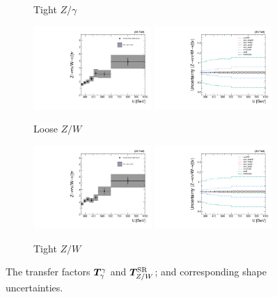 \begin{figure}[]
\begin{center}
\begin{subfigure}[t]{0.49\textwidth}
            \caption{Tight $Z/\gamma$}
        \end{subfigure}
        \begin{subfigure}[t]{0.49\textwidth}
            \includegraphics[width=0.49\textwidth]{figures/monotop/xfer/rfactor_wz_loose.pdf}
            \includegraphics[width=0.49\textwidth]{figures/monotop/uncertainties/variations_wz_loose.pdf}
            \caption{Loose $Z/W$}
        \end{subfigure}
        \begin{subfigure}[t]{0.49\textwidth}
            \includegraphics[width=0.49\textwidth]{figures/monotop/xfer/rfactor_wz.pdf}
            \includegraphics[width=0.49\textwidth]{figures/monotop/uncertainties/variations_wz.pdf}
            \caption{Tight $Z/W$}
        \end{subfigure}
        \caption{The transfer factors $\bm{T}^{\gamma}_{\gamma}$ and $\bm{T}^{\mathrm{SR}}_{Z/W}$; and corresponding shape uncertainties.}
        \label{fig:mt:theory_xfer}
    \end{center}
\end{figure}

